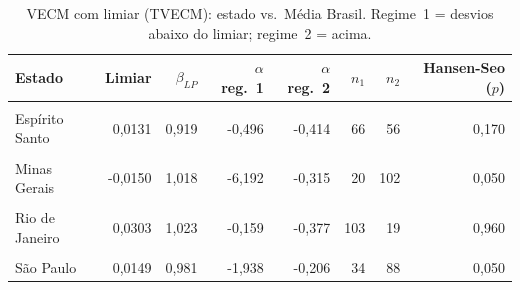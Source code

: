 \begin{table}[!h]
\centering
\caption{\label{tab:tvecm}VECM com limiar (TVECM): estado vs.\ Média Brasil. Regime~1 = desvios abaixo do limiar; regime~2 = acima.}
\centering
\fontsize{9}{11}\selectfont
\begin{tabular}[t]{lrrrrrrr}
\toprule
\textbf{Estado} & \textbf{Limiar} & \textbf{$\beta_{LP}$} & \textbf{$\alpha$ reg.\ 1} & \textbf{$\alpha$ reg.\ 2} & \textbf{$n_1$} & \textbf{$n_2$} & \textbf{Hansen-Seo ($p$)}\\
\midrule
\cellcolor{gray!10}{Bahia} & \cellcolor{gray!10}{-0,0306} & \cellcolor{gray!10}{0,890} & \cellcolor{gray!10}{0,017} & \cellcolor{gray!10}{-0,000} & \cellcolor{gray!10}{23} & \cellcolor{gray!10}{99} & \cellcolor{gray!10}{0,090}\\
Espírito Santo & 0,0131 & 0,919 & -0,496 & -0,414 & 66 & 56 & 0,170\\
\cellcolor{gray!10}{Goiás} & \cellcolor{gray!10}{-0,0054} & \cellcolor{gray!10}{0,980} & \cellcolor{gray!10}{-0,438} & \cellcolor{gray!10}{-0,595} & \cellcolor{gray!10}{35} & \cellcolor{gray!10}{87} & \cellcolor{gray!10}{0,600}\\
Minas Gerais & -0,0150 & 1,018 & -6,192 & -0,315 & 20 & 102 & 0,050\\
\cellcolor{gray!10}{Paraná} & \cellcolor{gray!10}{0,0194} & \cellcolor{gray!10}{0,978} & \cellcolor{gray!10}{-0,663} & \cellcolor{gray!10}{0,104} & \cellcolor{gray!10}{47} & \cellcolor{gray!10}{75} & \cellcolor{gray!10}{0,420}\\
Rio de Janeiro & 0,0303 & 1,023 & -0,159 & -0,377 & 103 & 19 & 0,960\\
\cellcolor{gray!10}{Santa Catarina} & \cellcolor{gray!10}{0,0268} & \cellcolor{gray!10}{0,961} & \cellcolor{gray!10}{-0,500} & \cellcolor{gray!10}{-2,302} & \cellcolor{gray!10}{92} & \cellcolor{gray!10}{30} & \cellcolor{gray!10}{0,260}\\
São Paulo & 0,0149 & 0,981 & -1,938 & -0,206 & 34 & 88 & 0,050\\
\bottomrule
\end{tabular}
\end{table}
